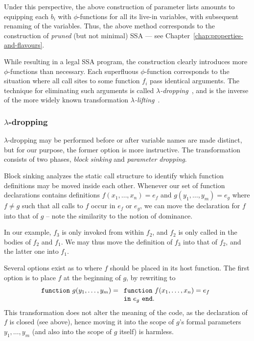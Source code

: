 Under this perspective, the above construction of parameter lists
amounts to equipping each $b_i$ with $\phi$-functions for all its
live-in variables, with subsequent renaming of the variables. Thus,
the above method corresponds to the construction of \emph{pruned} (but
not minimal) SSA --- see Chapter~\ref{chap:properties-and-flavours}.

While resulting in a legal SSA program, the construction clearly
introduces more $\phi$-functions than necessary. Each superfluous
$\phi$-function corresponds to the situation where all call sites to
some function $f_i$ pass identical arguments. The technique for
eliminating such arguments is called
\emph{$\lambda$-dropping}~\cite{DBLP:journals/tcs/DanvyS00}, and is
the inverse of the more widely known transformation
\emph{$\lambda$-lifting}~\cite{DBLP:conf/fpca/Johnsson85}. 

\subsubsection{$\lambda$-dropping}
\label{section:Part1:Semantics:lambdaDropping}

$\lambda$-dropping may be performed before or after variable names are
made distinct, but for our purpose, the former option is more
instructive.  The transformation consists of two phases, \emph{block
sinking} and \emph{parameter dropping}.

Block sinking analyzes the static call structure to identify which
function definitions may be moved inside each other. Whenever our set
of function declarations contains definitions $f (x_1,\ldots,x_n) =
e_f$ and $ g (y_1,\ldots,y_m) = e_g$ where $f \neq g$ such that all
calls to $f$ occur in $e_f$ or $e_g$, we can move the declaration for
$f$ into that of $g$ -- note the similarity to the notion of
dominance.

In our example, $f_3$ is only invoked from
within $f_2$, and $f_2$ is only called in the bodies of $f_2$ and
$f_1$.  We may thus move the definition of $f_3$ into that of $f_2$,
and the latter one into $f_1$.

Several options exist as to where $f$ should be placed in its host
function. The first option is to place $f$ at the beginning of $g$,
by rewriting to 
$$\mathtt{function}\ g(y_1,\ldots,y_m) =
\begin{array}[t]{l} 
  \mathtt{function}\ f(x_1,\ldots,x_n) = e_f\\
  \mathtt{in}\ e_g\ \mathtt{end}.
\end{array}
$$ This transformation does not alter the meaning of the code, as the
declaration of $f$ is closed (see above), hence moving it into the
scope of $g$'s formal parameters $y_1,\ldots,y_m$ (and also into the
scope of $g$ itself) is harmless. 

